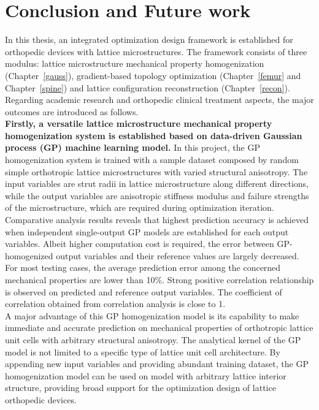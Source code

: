 \documentclass[12pt]{extbook}
\begin{document}
\chapter{Conclusion and Future work}
\label{sec_5}

In this thesis, an integrated optimization design framework is established for orthopedic devices with lattice microstructures. The framework consists of three modulus: lattice microstructure mechanical property homogenization (Chapter~\ref{gauss}), gradient-based topology optimization (Chapter~\ref{femur} and Chapter~\ref{spine}) and lattice configuration reconstruction (Chapter~\ref{recon}). Regarding academic research and orthopedic clinical treatment aspects, the major outcomes are introduced as follows.\\

{\bf Firstly, a versatile lattice microstructure mechanical property homogenization system is established based on data-driven Gaussian process (GP) machine learning model.} In this project, the GP homogenization system is trained with a sample dataset composed by random simple orthotropic lattice microstructures with varied structural anisotropy. The input variables are strut radii in lattice microstructure along different directions, while the output variables are anisotropic stiffness modulus and failure strengths of the microstructure, which are required during optimization iteration.\\

Comparative analysis results reveals that highest prediction accuracy is achieved when independent single-output GP models are established for each output variables. Albeit higher computation cost is required, the error between GP-homogenized output variables and their reference values are largely decreased. For most testing cases, the average prediction error among the concerned mechanical properties are lower than 10\%. Strong positive correlation relationship is observed on predicted and reference output variables. The coefficient of correlation obtained from correlation analysis is close to 1.\\ 

A major advantage of this GP homogenization model is its capability to make immediate and accurate prediction on mechanical properties of orthotropic lattice unit cells with arbitrary structural anisotropy. The analytical kernel of the GP model is not limited to a specific type of lattice unit cell architecture. By appending new input variables and providing abundant training dataset, the GP homogenization model can be used on model with arbitrary lattice interior structure, providing broad support for the optimization design of lattice orthopedic devices.\\
\end{document}

